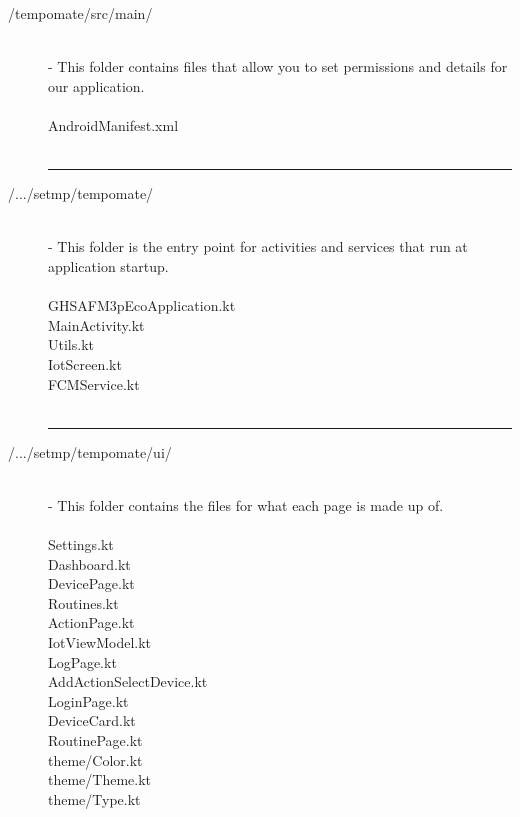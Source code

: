 \begin{enumerate}[label=\alph*]
\begin{description}
    \item[/tempomate/src/main/] \hfill \\
    \small
    - This folder contains files that allow you to set permissions and details for our application.\\\\
    \footnotesize
        AndroidManifest.xml  \\\\

            \vspace{-0.2cm}
      \hrule
      \vspace{0.2cm}
      
    \item[/.../setmp/tempomate/] \hfill \\
    \small
    - This folder is the entry point for activities and services that run at application startup.\\\\
    \footnotesize
        GHSAFM3pEcoApplication.kt  \\
        MainActivity.kt  \\
        Utils.kt  \\
        IotScreen.kt  \\
        FCMService.kt  \\\\

            \vspace{-0.2cm}
      \hrule
      \vspace{0.2cm}
      
    \item[/.../setmp/tempomate/ui/] \hfill \\
    \small
    - This folder contains the files for what each page is made up of.\\\\
    \footnotesize
        Settings.kt  \\
        Dashboard.kt  \\
        DevicePage.kt  \\
        Routines.kt  \\
        ActionPage.kt  \\
        IotViewModel.kt  \\
        LogPage.kt  \\
        AddActionSelectDevice.kt  \\
        LoginPage.kt  \\
        DeviceCard.kt  \\
        RoutinePage.kt  \\
        theme/Color.kt  \\
        theme/Theme.kt  \\
        theme/Type.kt  \\\\


\end{description}
\end{enumerate}
